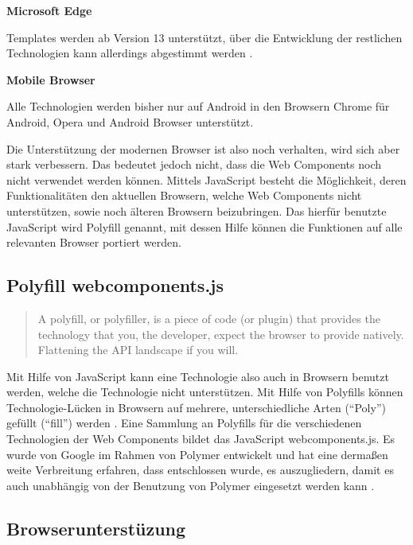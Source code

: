 \textbf{Microsoft Edge}

Templates werden ab Version 13 unterstützt, über die Entwicklung der restlichen Technologien kann allerdings abgestimmt werden \cite{citeulike:13914237}.

\textbf{Mobile Browser}

Alle Technologien werden bisher nur auf Android in den Browsern Chrome für Android, Opera und Android Browser unterstützt.

Die Unterstützung der modernen Browser ist also noch verhalten, wird sich aber stark verbessern. Das bedeutet jedoch nicht, dass die Web Components noch nicht verwendet werden können. Mittels JavaScript besteht die Möglichkeit, deren Funktionalitäten den aktuellen Browsern, welche Web Components nicht unterstützen, sowie noch älteren Browsern beizubringen. Das hierfür benutzte JavaScript wird Polyfill genannt, mit dessen Hilfe können die Funktionen auf alle relevanten Browser portiert werden.


\subsection{Polyfill webcomponents.js}\label{polyfill-webcomponents.js}

\begin{quote}
A polyfill, or polyfiller, is a piece of code (or plugin) that provides the technology that you, the developer, expect the browser to provide natively. Flattening the \ac{API} landscape if you will. \cite{citeulike:13914241}
\end{quote}

Mit Hilfe von JavaScript kann eine Technologie also auch in Browsern benutzt werden, welche die Technologie nicht unterstützen. Mit Hilfe von Polyfills können Technologie-Lücken in Browsern auf mehrere, unterschiedliche Arten (``Poly'') gefüllt (``fill'') werden \cite{citeulike:13914234}. Eine Sammlung an Polyfills für die verschiedenen Technologien der Web Components bildet das JavaScript webcomponents.js. Es wurde von Google im Rahmen von Polymer entwickelt und hat eine dermaßen weite Verbreitung erfahren, dass entschlossen wurde, es auszugliedern, damit es auch unabhängig von der Benutzung von Polymer eingesetzt werden kann \cite{citeulike:13914239}.


\subsection{Browserunterstüzung}\label{polyfills-browserunterstuetzung}

